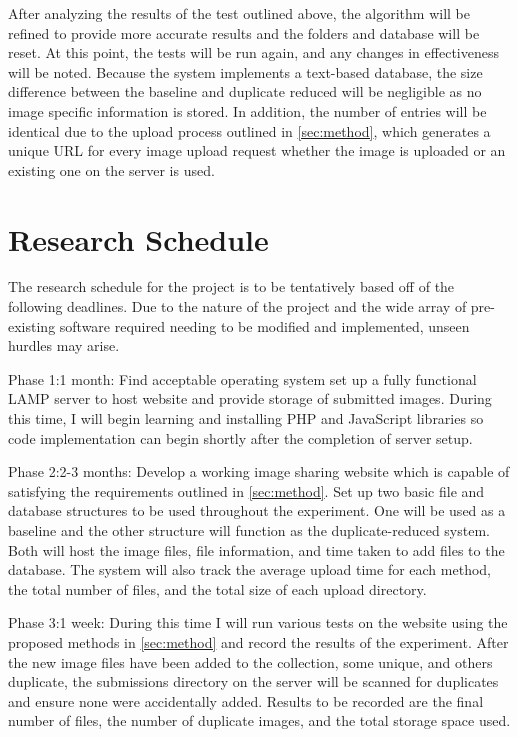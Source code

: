 \documentclass[11pt]{article}
\begin{document}
After analyzing the results of the test outlined above, the algorithm will be refined to provide more accurate results and the folders and database will be reset. At this point, the tests will be run again, and any changes in effectiveness will be noted. Because the system implements a text-based database, the size difference between the baseline and duplicate reduced will be negligible as no image specific information is stored. In addition, the number of entries will be identical due to the upload process outlined in \ref{sec:method}, which generates a unique URL for every image upload request whether the image is uploaded or an existing one on the server is used.

\vspace*{-.1in}
\section{Research Schedule}
\label{sec:schedule}
\vspace*{-.1in}

The research schedule for the project is to be tentatively based off of the following deadlines.
Due to the nature of the project and the wide array of pre-existing software required needing to
be modified and implemented, unseen hurdles may arise.

Phase 1:1 month: Find acceptable operating system set up a fully functional LAMP server to host website and provide storage of submitted images. During this time, I will begin learning and installing PHP and JavaScript libraries so code implementation can begin shortly after the completion of server setup.

Phase 2:2-3 months: Develop a working image sharing website which is capable of satisfying the requirements
outlined in \ref{sec:method}. Set up two basic file and database structures to be used throughout the experiment. One will be used as a baseline and the other structure will function as the duplicate-reduced system. Both will host the image files, file information, and time taken to add files to the database. The system will also track the average upload time for each method, the total number of files, and the total size of each upload directory.

Phase 3:1 week: During this time I will run various tests on the website using the proposed
methods in \ref{sec:method} and record the results of the experiment. After the new image files have been added to the collection, some unique, and others duplicate, the submissions directory on the server will be scanned for  duplicates and ensure none were accidentally added. Results to be recorded are the final number of files, the number of duplicate images, and the total storage space used.
\end{document}
